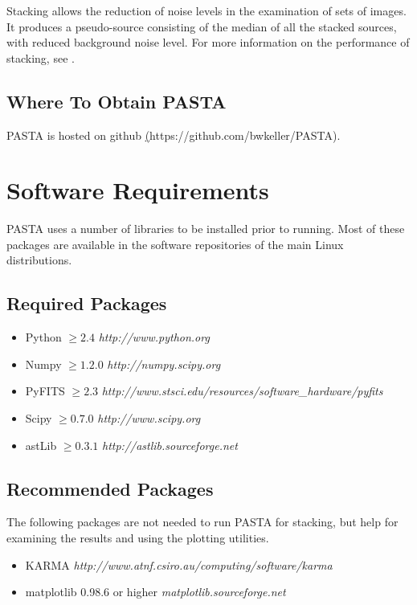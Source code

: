 \documentclass{article}
\begin{document}
Stacking allows the reduction of noise levels in the examination of sets of 
images.  It produces a pseudo-source consisting of the median of all the stacked
sources, with reduced background noise level.  For more information on the 
performance of stacking, see \cite[Stil et al. 2014]{stil2014}.

\subsection{Where To Obtain PASTA}
PASTA is hosted on github
\hyperref[https://github.com/bwkeller/PASTA](https://github.com/bwkeller/PASTA).

\section{Software Requirements}
PASTA uses a number of libraries to be installed prior to running.  Most of these
packages are available in the software repositories of the main Linux 
distributions.

\subsection{Required Packages}
\begin{itemize}
	\item Python $\ge 2.4$ \emph{http://www.python.org}
	\item Numpy $\ge 1.2.0$ \emph{http://numpy.scipy.org}
	\item PyFITS $\ge 2.3$ \emph{http://www.stsci.edu/resources/software\_hardware/pyfits}
	\item Scipy $\ge 0.7.0$ \emph{http://www.scipy.org}
	\item astLib $\ge 0.3.1$ \emph{http://astlib.sourceforge.net}
\end{itemize}

\subsection{Recommended Packages}
The following packages are not needed to run PASTA for stacking, but help for
examining the results and using the plotting utilities.
\begin{itemize}
	\item KARMA \emph{http://www.atnf.csiro.au/computing/software/karma}
	\item matplotlib 0.98.6 or higher \emph{matplotlib.sourceforge.net}
\end{itemize}
\end{document}
